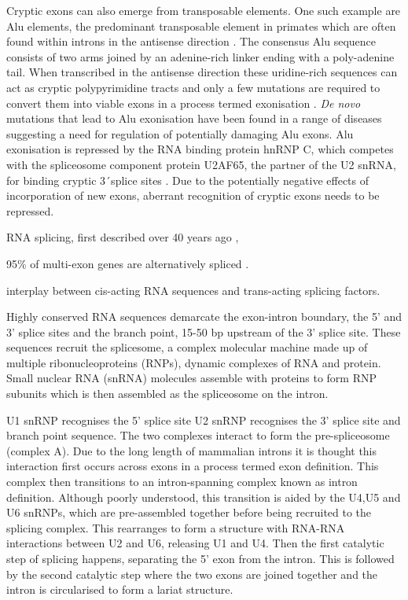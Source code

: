 Cryptic exons can also emerge from transposable elements. One such example are Alu elements, the predominant transposable element in primates which are often found within introns in the antisense direction \citep{Deininger2011-hc}. The consensus Alu sequence consists of two arms joined by an adenine-rich linker ending with a poly-adenine tail.  When transcribed in the antisense direction these uridine-rich sequences can act as cryptic polypyrimidine tracts and only a few mutations are required to convert them into viable exons in a process termed exonisation \citep{Sorek2002-cm}. \textit{De novo} mutations that lead to Alu exonisation have been found in a range of diseases \citep{Vorechovsky2010-or} suggesting a need for regulation of potentially damaging Alu exons. Alu exonisation is repressed by the RNA binding protein hnRNP C, which competes with the spliceosome component protein U2AF65, the partner of the U2 snRNA, for binding cryptic 3\'\ splice sites \citep{Zarnack2013-nv}. Due to the potentially negative effects of incorporation of new exons, aberrant recognition of cryptic exons needs to be repressed.




RNA splicing, first described over 40 years ago \citep{Berget1977,Chow1977}, 

95\% of multi-exon genes are alternatively spliced \citep{Pan2008,Wang2008}.

interplay between cis-acting RNA sequences and trans-acting splicing factors.

Highly conserved RNA sequences demarcate the exon-intron boundary, the 5' and 3' splice sites and the branch point, 15-50 bp upstream of the 3' splice site.
These sequences recruit the splicesome, a complex molecular machine made up of multiple ribonucleoproteins (RNPs), dynamic complexes of RNA and protein.
Small nuclear RNA (snRNA) molecules  assemble with proteins to form RNP subunits which is then assembled as the spliceosome on the intron.

U1 snRNP recognises the 5' splice site
U2 snRNP recognises the 3' splice site and branch point sequence.
The two complexes interact to form the pre-spliceosome (complex A).
Due to the long length of mammalian introns it is thought this interaction first occurs across exons in a process termed exon definition.
This complex then transitions to an intron-spanning complex known as intron definition.
Although poorly understood, this transition is aided by the U4,U5 and U6 snRNPs, which are pre-assembled together before being recruited to the splicing complex.
This rearranges to form a structure with RNA-RNA interactions between U2 and U6, releasing U1 and U4.
Then the first catalytic step of splicing happens, separating the 5' exon from the intron.
This is followed by the second catalytic step where the two exons are joined together and the intron is circularised to form a lariat structure.


